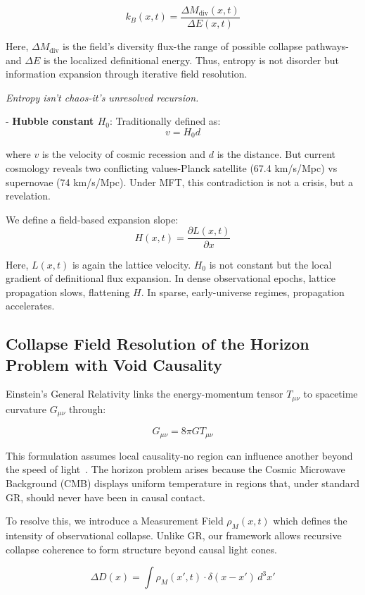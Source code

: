 \[ k_B(x,t) = \frac{\Delta M_{\text{div}}(x,t)}{\Delta E(x,t)} \]

Here, $\Delta M_{\text{div}}$ is the field's diversity flux-the range of possible collapse pathways-and $\Delta E$ is the localized definitional energy. Thus, entropy is not disorder but information expansion through iterative field resolution.

\begin{flushright}
\textit{Entropy isn’t chaos-it’s unresolved recursion.}
\end{flushright}

- \textbf{Hubble constant $H_0$}: Traditionally defined as:
\[ v = H_0 d \]

where $v$ is the velocity of cosmic recession and $d$ is the distance. But current cosmology reveals two conflicting values-Planck satellite (67.4 km/s/Mpc) vs supernovae (74 km/s/Mpc). Under MFT, this contradiction is not a crisis, but a revelation.

We define a field-based expansion slope:
\[ H(x,t) = \frac{\partial L(x,t)}{\partial x} \]

Here, $L(x,t)$ is again the lattice velocity. $H_0$ is not constant but the local gradient of definitional flux expansion. In dense observational epochs, lattice propagation slows, flattening $H$. In sparse, early-universe regimes, propagation accelerates.

\subsection*{Collapse Field Resolution of the Horizon Problem with Void Causality}

Einstein's General Relativity links the energy-momentum tensor \( T_{\mu\nu} \) to spacetime curvature \( G_{\mu\nu} \) through:

\[ G_{\mu\nu} = 8\pi G T_{\mu\nu} \]

This formulation assumes local causality-no region can influence another beyond the speed of light~\cite{ashtekar2004background}. The horizon problem arises because the Cosmic Microwave Background (CMB) displays uniform temperature in regions that, under standard GR, should never have been in causal contact.

To resolve this, we introduce a Measurement Field \( \rho_M(x, t) \) which defines the intensity of observational collapse. Unlike GR, our framework allows recursive collapse coherence to form structure beyond causal light cones.

\[ \Delta D(x) = \int \rho_M(x', t) \cdot \delta(x - x') \, d^3x' \]

